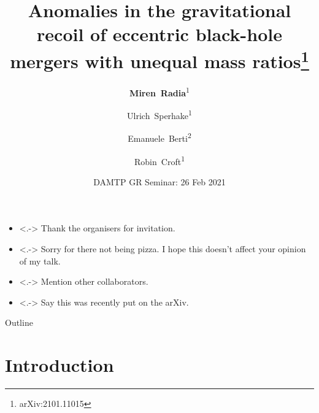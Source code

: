\documentclass[smaller,aspectratio=169]{beamer}
\title[Eccentric Kicks] %
{Anomalies in the gravitational recoil of eccentric black-hole mergers with unequal mass ratios\footnote{arXiv:2101.11015\vspace{0.5 cm}}}
\author{
    \textbf{Miren~Radia}\textsuperscript{{1}} \and 
    Ulrich~Sperhake\textsuperscript{1} \and 
    Emanuele~Berti\textsuperscript{2} \and 
    Robin~Croft\textsuperscript{1}}
\institute
{
    \textsuperscript{1} Department of Applied Mathematics \& 
    Theoretical Physics, University of Cambridge\\
    \textsuperscript{2} Department of Physics \& Astronomy, 
    Johns Hopkins University
}
\date{DAMTP GR Seminar: 26 Feb 2021}
\begin{document}
\begin{frame}
  \titlepage
\end{frame}

\note
{   
    \begin{itemize}
        \item<.-> 
            Thank the organisers for invitation.
        \item<.-> 
            Sorry for there not being pizza. I hope this doesn't affect
            your opinion of my talk.
        \item<.-> 
            Mention other collaborators.
        \item<.-> 
            Say this was recently put on the arXiv.
    \end{itemize}
}


\begin{frame}{Outline}
  \tableofcontents
\end{frame}





\section{Introduction}
\end{document}

